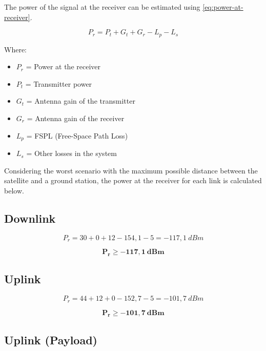 The power of the signal at the receiver can be estimated using \autoref{eq:power-at-receiver}.

\begin{equation} \label{eq:power-at-receiver}
    P_{r} = P_{t} + G_{t} + G_{r} - L_{p} - L_{s}
\end{equation}

Where:

\begin{itemize}
    \item $P_{r}$ = Power at the receiver
    \item $P_{t}$ = Transmitter power
    \item $G_{t}$ = Antenna gain of the transmitter
    \item $G_{r}$ = Antenna gain of the receiver
    \item $L_{p}$ = FSPL (Free-Space Path Loss)
    \item $L_{s}$ = Other losses in the system
\end{itemize}

Considering the worst scenario with the maximum possible distance between the satellite and a ground station, the power at the receiver for each link is calculated below.

\subsection{Downlink}

\begin{equation}
    P_{r} = 30 + 0 + 12 - 154,1 - 5 = -117,1\ dBm
\end{equation}

\begin{equation}
    \mathbf{P_{r} \geq -117,1\ dBm}
\end{equation}

\subsection{Uplink}

\begin{equation}
    P_{r} = 44 + 12 + 0 - 152,7 - 5 = -101,7\ dBm
\end{equation}

\begin{equation}
    \mathbf{P_{r} \geq -101,7\ dBm}
\end{equation}

\subsection{Uplink (Payload)}

